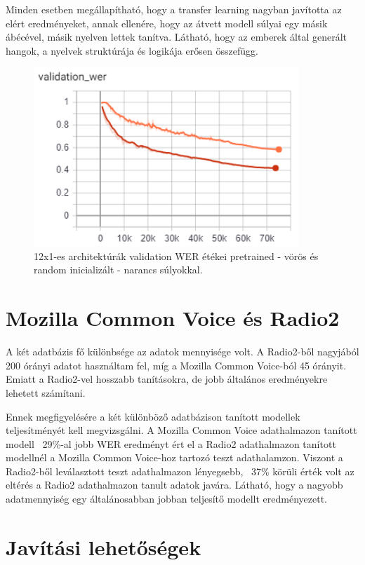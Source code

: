 Minden esetben megállapítható, hogy a transfer learning nagyban javította az elért eredményeket, annak ellenére, hogy az átvett modell súlyai egy másik ábécével, másik nyelven lettek tanítva.  Látható, hogy az emberek által generált hangok, a nyelvek struktúrája és logikája erősen összefügg.

\begin{figure}[!ht]
\centering
\includegraphics[width=100mm, keepaspectratio]{figures/12x1_pretrained_vs_random.png}
\caption{12x1-es architektúrák validation WER étékei pretrained - vörös és random inicializált - narancs súlyokkal.}
\end{figure}

\section{Mozilla Common Voice és Radio2}

A két adatbázis fő különbsége az adatok mennyisége volt. A Radio2-ből nagyjából 200 órányi adatot használtam fel, míg a Mozilla Common Voice-ból 45 órányit. Emiatt a Radio2-vel hosszabb tanításokra, de jobb általános eredményekre lehetett számítani.

Ennek megfigyelésére a két különböző adatbázison tanított modellek teljesítményét kell megvizsgálni. A Mozilla Common Voice adathalmazon tanított modell ~29\%-al jobb WER eredményt ért el a Radio2 adathalmazon tanított modellnél a Mozilla Common Voice-hoz tartozó teszt adathalamzon. Viszont a Radio2-ből leválasztott teszt adathalmazon lényegsebb, ~37\% körüli érték volt az eltérés a Radio2 adathalmazon tanult adatok javára. Látható, hogy a nagyobb adatmennyiség egy általánosabban jobban teljesítő modellt eredményezett.

\section{Javítási lehetőségek}

